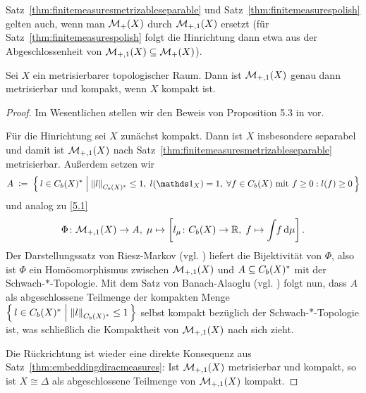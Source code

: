 \documentclass[../main/main.tex]{subfiles}
\begin{document}
	\begin{Bemerkung}
		Satz~\ref{thm:finitemeasuresmetrizableseparable} und Satz~\ref{thm:finitemeasurespolish} gelten auch, wenn man $\mathcal{M}_{+}(X)$ durch $\mathcal{M}_{+,1}(X)$ ersetzt 
		(für Satz~\ref{thm:finitemeasurespolish} folgt die Hinrichtung dann etwa aus der Abgeschlossenheit von $\mathcal{M}_{+,1}(X) \subseteq \mathcal{M}_{+}(X)$).
	\end{Bemerkung}

	\begin{Satz}
		\label{thm:compactimpliescompactmeasures}
		Sei $X$ ein metrisierbarer topologischer Raum. Dann ist $\mathcal{M}_{+,1}(X)$ genau dann metrisierbar und kompakt, wenn $X$ kompakt ist.
	\end{Satz}
	
	\begin{proof}
		Im Wesentlichen stellen wir den Beweis von Proposition 5.3 in \cite{vanGaans.200203} vor.
		
		Für die Hinrichtung sei $X$ zunächst kompakt. Dann ist $X$ insbesondere separabel und damit ist $\mathcal{M}_{+,1}(X)$ 
		nach Satz~\ref{thm:finitemeasuresmetrizableseparable} metrisierbar.
		Außerdem setzen wir
		\[ A \; \defby \; \setcomp{l \in \Bdcontfct{X}^\ast}{\norm{l}_{\Bdcontfct{X}^\ast} \leq 1, \; l(\indfct_{X}) = 1, \; 
			\forall f \in \Bdcontfct{X} \text{ mit } f \geq 0 : l(f) \geq 0}\]
		und analog zu \eqref{5.1}
		\[ \Phi \colon \mathcal{M}_{+,1}(X) \to A, \; \mu \mapsto \left[l_\mu \colon C_b(X) \to \mathbb{R}, \; f \mapsto \int_{} \, f \, \mathrm{d}\mu \right]  \text{.} \]
		Der Darstellungssatz von Riesz-Markov (vgl. \cite[Satz 4.8.8]{Simon.2015}) liefert die Bijektivität von $\Phi$, also ist $\Phi$ ein 
		Homöomorphismus zwischen $\mathcal{M}_{+,1}(X)$ und $A \subseteq C_b(X)^\ast$ 
		mit der Schwach-$\ast$-Topologie. Mit dem Satz von Banach-Alaoglu (vgl. \cite[Satz 5.8.1]{Simon.2015}) folgt nun, dass $A$ als abgeschlossene Teilmenge der kompakten Menge 
		$\left\{\, l \in C_b(X)^\ast \; \middle| \; \left\lVert l\right\rVert_{C_b(X)^\ast} \leq 1 \,\right\}$ selbst kompakt bezüglich der Schwach-$\ast$-Topologie ist, 
		was schließlich die Kompaktheit von $\mathcal{M}_{+,1}(X)$ nach sich zieht.
		
		Die Rückrichtung ist wieder eine direkte Konsequenz aus Satz~\ref{thm:embeddingdiracmeasures}: Ist $\mathcal{M}_{+,1}(X)$ metrisierbar und kompakt, so ist 
		$X \cong \Delta$ als abgeschlossene Teilmenge von $\mathcal{M}_{+,1}(X)$ kompakt.
	\end{proof}
	
\end{document}
